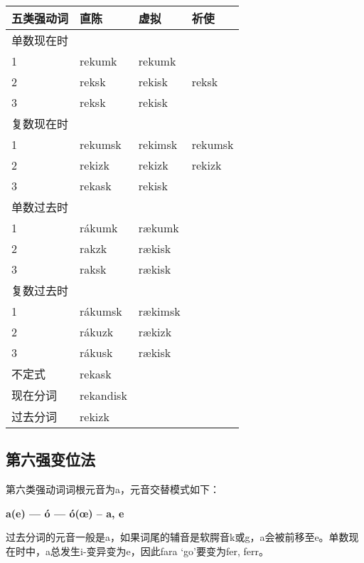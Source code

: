 \begin{longtable}{llll}
    \toprule
    五类强动词 & 直陈      & 虚拟    & 祈使    \\
    \midrule
    \endhead
    \bottomrule
    \endfoot
    单数现在时 &           &         &         \\
    1          & rekumk    & rekumk  &         \\
    2          & reksk     & rekisk  & reksk   \\
    3          & reksk     & rekisk  &         \\
    复数现在时 &           &         &         \\
    1          & rekumsk   & rekimsk & rekumsk \\
    2          & rekizk    & rekizk  & rekizk  \\
    3          & rekask    & rekisk  &         \\
    单数过去时 &           &         &         \\
    1          & rákumk    & rækumk  &         \\
    2          & rakzk     & rækisk  &         \\
    3          & raksk     & rækisk  &         \\
    复数过去时 &           &         &         \\
    1          & rákumsk   & rækimsk &         \\
    2          & rákuzk    & rækizk  &         \\
    3          & rákusk    & rækisk  &         \\
    不定式     & rekask    &         &         \\
    现在分词   & rekandisk &         &         \\
    过去分词   & rekizk    &         &         \\
\end{longtable}

\subsection{第六强变位法}\label{第六强变位法}

第六类强动词词根元音为a，元音交替模式如下：
\begin{center}
    \textbf{a(e) --- ó --- ó(œ) -- a, e}
\end{center}


过去分词的元音一般是a，如果词尾的辅音是软腭音k或g，a会被前移至e。单数现在时中，a总发生i-变异变为e，因此fara `go‌'要变为fer, ferr。


